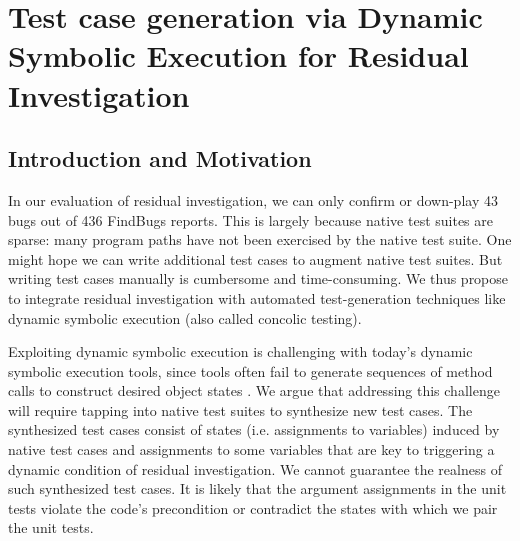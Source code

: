 \section{Test case generation via Dynamic Symbolic Execution for Residual Investigation}

\subsection{Introduction and Motivation}

In our evaluation of residual investigation, we can only confirm or down-play 43 bugs out of 436 FindBugs reports. This is largely because native test suites are sparse: many program paths have not been exercised by the native test suite. One might hope we can write additional test cases to augment native test suites. But writing test cases manually is cumbersome and time-consuming. We thus propose to integrate residual investigation with automated test-generation techniques like dynamic symbolic execution (also called concolic testing).

Exploiting dynamic symbolic execution is challenging with today's dynamic symbolic execution tools, since tools often fail to generate sequences of method calls to construct desired object states \cite{Xiao:2011:PIP:1985793.1985876}.
 We argue that addressing this challenge will require tapping into native test suites to synthesize new test cases. The synthesized test cases consist of states (i.e. assignments to variables) induced by native test cases and assignments to some variables that are key to triggering a dynamic condition of residual investigation.  
 We cannot guarantee the realness of such synthesized test cases. It is likely that the argument assignments in the unit tests violate the code's precondition or contradict the states with which we pair the unit tests.  

